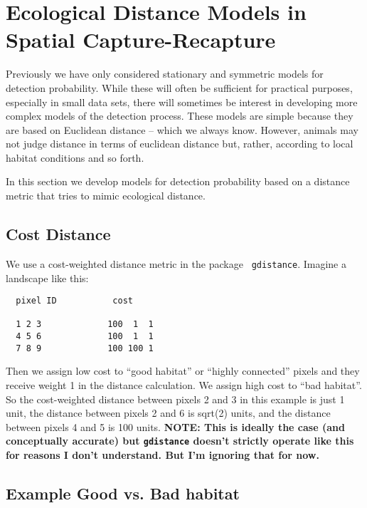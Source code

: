 \chapter{
Ecological Distance Models in Spatial Capture-Recapture
}
\label{chapt.implicit}


\vspace{.3in}


Previously we have only considered stationary and symmetric models for
detection probability. While these will often be sufficient for
practical purposes, especially in small data sets, there will
sometimes be interest in developing more complex models of the
detection process.  These models are simple because they are based on
Euclidean distance -- which we always know. However, animals may not
judge distance in terms of euclidean distance but, rather, according
to local habitat conditions and so forth. 

In this section we develop models for detection probability based on a
distance metric that tries to mimic ecological distance. 


\section{Cost Distance}

We use a cost-weighted distance metric in the package \mbox{\tt
  gdistance}. Imagine a landscape like this:
\begin{verbatim}
  pixel ID           cost

  1 2 3             100  1  1 
  4 5 6             100  1  1
  7 8 9             100 100 1

\end{verbatim}
Then we assign low cost to ``good habitat'' or ``highly connected''
pixels and they receive weight 1 in the distance calculation. We
assign high cost to ``bad habitat''. So the cost-weighted distance
between pixels 2 and 3 in this example is just 1 unit, the distance
between pixels 2 and 6 is sqrt(2) units, and the distance between
pixels 4 and 5 is 100 units.
{\bf NOTE: This is ideally the case (and conceptually accurate) but
\mbox{\tt gdistance} doesn't strictly operate like this for reasons I
don't understand. But I'm ignoring that for now.
}



\section{Example Good vs. Bad habitat}




